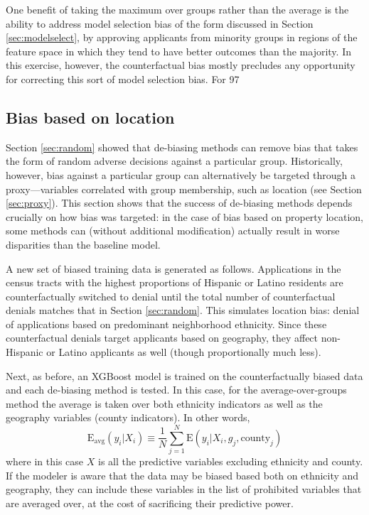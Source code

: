 One benefit of taking the maximum over groups rather than the average is the ability to address model selection bias of the form discussed in Section \ref{sec:modelselect}, by approving applicants from minority groups in regions of the feature space in which they tend to have better outcomes than the majority. In this exercise, however, the counterfactual bias mostly precludes any opportunity for correcting this sort of model selection bias. For 97\

\subsection{Bias based on location}\label{sec:redlining}

Section \ref{sec:random} showed that de-biasing methods can remove bias that takes the form of random adverse decisions against a particular group. Historically, however, bias against a particular group can alternatively be targeted through a proxy---variables correlated with group membership, such as location (see Section \ref{sec:proxy}). This section shows that the success of de-biasing methods depends crucially on how bias was targeted: in the case of bias based on property location, some methods can (without additional modification) actually result in worse disparities than the baseline model.

A new set of biased training data is generated as follows. Applications in the census tracts with the highest proportions of Hispanic or Latino residents are counterfactually switched to denial until the total number of counterfactual denials matches that in Section \ref{sec:random}. This simulates location bias: denial of applications based on predominant neighborhood ethnicity. Since these counterfactual denials target applicants based on geography, they affect non-Hispanic or Latino applicants as well (though proportionally much less).

Next, as before, an XGBoost model is trained on the counterfactually biased data and each de-biasing method is tested. In this case, for the average-over-groups method the average is taken over both ethnicity indicators as well as the geography variables (county indicators). In other words, 
\begin{equation}\label{eq:popesydnorgeo}
	\text{E}_{\text{avg}}\left(y_i\vert X_i\right) \equiv \frac{1}{N}\sum_{j = 1}^N \text{E}\left(y_i\vert X_i,g_j,\text{county}_j\right)
\end{equation}
where in this case $X$ is all the predictive variables excluding ethnicity and county. If the modeler is aware that the data may be biased based both on ethnicity and geography, they can include these variables in the list of prohibited variables that are averaged over, at the cost of sacrificing their predictive power.  

